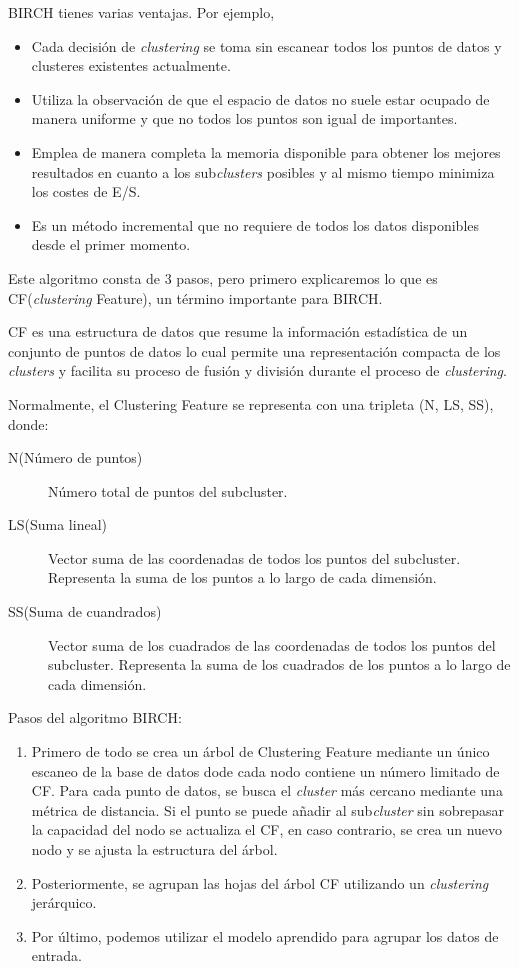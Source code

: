 BIRCH tienes varias ventajas. Por ejemplo, 
\begin{itemize}
    \item Cada decisión de \emph{clustering} se toma sin escanear todos los puntos de datos y clusteres existentes actualmente.
    \item Utiliza la observación de que el espacio de datos no suele estar ocupado de manera uniforme y que no todos los puntos son igual de importantes.
    \item Emplea de manera completa la memoria disponible para obtener los mejores resultados en cuanto a los sub\emph{clusters} posibles y al mismo tiempo minimiza los costes de E/S.
    \item Es un método incremental que no requiere de todos los datos disponibles desde el primer momento.
\end{itemize}

Este algoritmo consta de 3 pasos, pero primero explicaremos lo que es CF(\emph{clustering} Feature), un término importante para BIRCH.

CF es una estructura de datos que resume la información estadística de un conjunto de puntos de datos lo cual permite una representación compacta de los \emph{clusters} y facilita su proceso de fusión y división durante el proceso de \emph{clustering}.

Normalmente, el Clustering Feature se representa con una tripleta (N, LS, SS), donde:

\begin{description}
    \item[N(Número de puntos)] Número total de puntos del subcluster.
    \item[LS(Suma lineal)] Vector suma de las coordenadas de todos los puntos del subcluster. Representa la suma de los puntos a lo largo de cada dimensión.
    \item[SS(Suma de cuandrados)] Vector suma de los cuadrados de las coordenadas de todos los puntos del subcluster. Representa la suma de los cuadrados de los puntos a lo largo de cada dimensión.
\end{description}

Pasos del algoritmo BIRCH:

\begin{enumerate}
    \item Primero de todo se crea un árbol de Clustering Feature mediante un único escaneo de la base de datos dode cada nodo contiene un número limitado de CF. Para cada punto de datos, se busca el \emph{cluster} más cercano mediante una métrica de distancia. Si el punto se puede añadir al sub\emph{cluster} sin sobrepasar la capacidad del nodo se actualiza el CF, en caso contrario, se crea un nuevo nodo y se ajusta la estructura del árbol.
    \item Posteriormente, se agrupan las hojas del árbol CF utilizando un \emph{clustering} jerárquico.
    \item Por último, podemos utilizar el modelo aprendido para agrupar los datos de entrada.
\end{enumerate}

